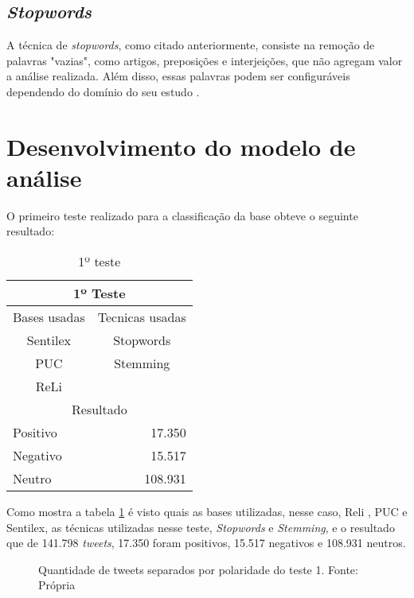 \subsection{\textit{Stopwords}}
A técnica de \textit{stopwords}, como citado anteriormente, consiste na remoção de palavras "vazias", como artigos, preposições e interjeições, que não agregam valor a análise realizada. Além disso, essas palavras podem ser configuráveis dependendo do domínio do seu estudo  \cite{Rajaraman_Ullman_2011}.

\section{Desenvolvimento do modelo de análise}\label{sec:desenv-moda}
O primeiro teste realizado para a classificação da base obteve o seguinte resultado:
\begin{table}[H]
	\centering
	\caption{1º teste}
	\label{teste-1}
	\begin{tabular}{|l|l|r}
		\hline
		\multicolumn{3}{|c|}{1º Teste} \\ \hline
		\multicolumn{2}{|l|}{Bases usadas} & \multicolumn{1}{r|}{Tecnicas usadas} \\ \hline
		\multicolumn{2}{|c|}{Sentilex} & \multicolumn{1}{c|}{Stopwords} \\
		\multicolumn{2}{|c|}{PUC} & \multicolumn{1}{c|}{Stemming} \\ \cline{3-3} 
		\multicolumn{2}{|c|}{ReLi} &  \\ \hline
		\multicolumn{3}{|c|}{Resultado} \\ \hline
		\multicolumn{2}{|l|}{Positivo} & \multicolumn{1}{r|}{17.350} \\ \hline
		\multicolumn{2}{|l|}{Negativo} & \multicolumn{1}{r|}{15.517} \\ \hline
		\multicolumn{2}{|l|}{Neutro} & \multicolumn{1}{r|}{108.931} \\ \hline
	\end{tabular}
\end{table}

Como mostra a tabela \ref{teste-1} é visto quais as bases utilizadas, nesse caso, Reli , PUC e Sentilex, as técnicas utilizadas nesse teste, \textit{Stopwords} e \textit{Stemming}, e o resultado que de 141.798 \textit{tweets}, 17.350 foram positivos, 15.517 negativos e 108.931 neutros.
\begin{figure}[H]
	\centering{}
	\caption{Quantidade de tweets separados por polaridade do teste 1. Fonte: Própria}
	\label{teste-graf-1}
\end{figure}

